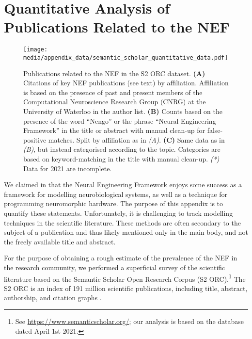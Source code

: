 \section{Quantitative Analysis of Publications Related to the NEF}
\label{app:nef_literature}

\begin{figure}[p]
	\centering
	\texttt{[image: media/appendix\_data/semantic\_scholar\_quantitative\_data.pdf]}%
	{\label{fig:nef_literature_a}}%
	{\label{fig:nef_literature_b}}%
	{\label{fig:nef_literature_c}}%
	\caption[Publications related to the NEF in the S2 ORC dataset]{Publications related to the NEF in the S2 ORC dataset.
	\textbf{(A)} Citations of key NEF publications (see text) by affiliation. Affiliation is based on the presence of past and present members of the Computational Neuroscience Research Group (CNRG) at the University of Waterloo in the author list.
	\textbf{(B)} Counts based on the presence of the word \enquote{Nengo} or the phrase \enquote{Neural Engineering Framework} in the title or abstract with manual clean-up for false-positive matches. Split by affiliation as in \emph{(A)}.
	\textbf{(C)} Same data as in \emph{(B)}, but instead categorised according to the topic. Categories are based on keyword-matching in the title with manual clean-up.
	\emph{(*)} Data for 2021 are incomplete.}
	\label{fig:nef_literature}
\end{figure}

We claimed in  that the Neural Engineering Framework enjoys some success as a framework for modelling neurobiological systems, as well as a technique for programming neuromorphic hardware.
The purpose of this appendix is to quantify these statements.
Unfortunately, it is challenging to track modelling techniques in the scientific literature.
These methods are often secondary to the subject of a publication and thus likely mentioned only in the main body, and not the freely available title and abstract.

For the purpose of obtaining a rough estimate of the prevalence of the NEF in the research community, we performed a superficial survey of the scientific literature based on the Semantic Scholar Open Research Corpus (S2 ORC).\footnote{See \url{https://www.semanticscholar.org/}; our analysis is based on the database dated April 1st 2021.}
The S2 ORC is an index of 191 million scientific publications, including title, abstract, authorship, and citation graphs \citep{ammar2018construction}.

